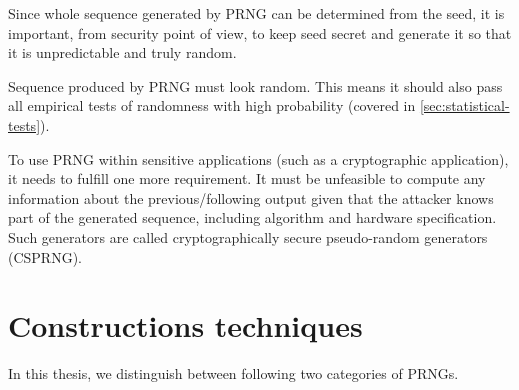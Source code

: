 \documentclass[
    digital,    %
    oneside,    %
    color,
    11pt,
    nocover,
    notable,
    nolof,
    nolot,
    final
]{fithesis3}
\renewcommand\_{\textunderscore\allowbreak}
\begin{document}
Since whole sequence generated by PRNG can be determined from the seed, it is important, from security point of view, to keep seed secret and generate it so that it is unpredictable and truly random.

Sequence produced by PRNG must look random. This means it should also pass all empirical tests of randomness with high probability (covered in \cref{sec:statistical-tests}). \cite{schneier1996applied}

To use PRNG within sensitive applications (such as a cryptographic application), it needs to fulfill one more requirement. It must be unfeasible to compute any information about the previous/following output given that the attacker knows part of the generated sequence, including algorithm and hardware specification. Such generators are called cryptographically secure pseudo-random generators (CSPRNG). \cite{schneier1996applied}

\section{Constructions techniques}

In this thesis, we distinguish between following two categories of PRNGs.
\end{document}
